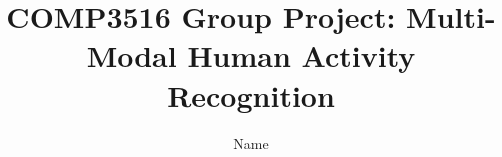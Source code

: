 \documentclass[sigconf, anonymous=false, review=true, 10pt]{acmart}
\def\sysname{\textsc{COMP3516 Group Project}\xspace}
\begin{document}
\title[\sysname]{COMP3516 Group Project: Multi-Modal Human Activity Recognition}


\author{Name}




\renewcommand{\shortauthors}{\sysname}



\maketitle





% 
\end{document}
